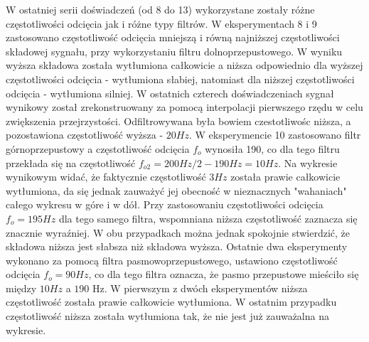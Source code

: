 \documentclass[12pt]{article}
\begin{document}
{{            W ostatniej serii doświadczeń (od 8 do 13) wykorzystane zostały różne
            częstotliwości odcięcia jak i różne typy filtrów. W eksperymentach 8 i 9
            zastosowano częstotliwość odcięcia mniejszą i równą najniższej częstotliwości
            składowej sygnału, przy wykorzystaniu filtru dolnoprzepustowego. W wyniku
            wyższa składowa została wytłumiona całkowicie a niższa odpowiednio dla wyższej
            częstotliwości odcięcia - wytłumiona słabiej, natomiast dla niższej
            częstotliwości odcięcia - wytłumiona silniej. W ostatnich czterech
            doświadczeniach sygnał wynikowy został zrekonstruowany za pomocą interpolacji
            pierwszego rzędu w celu zwiększenia przejrzystości. Odfiltrowywana była bowiem
            czestotliwośc niższa, a pozostawiona częstotliwość wyższa - $20Hz$. W
            eksperymencie 10 zastosowano filtr górnoprzepustowy a częstotliwość odcięcia
            $f_o$ wynosiła 190, co dla tego filtru przekłada się na częstotliwość $f_{o2} =
            200Hz / 2 - 190Hz = 10Hz$. Na wykresie wynikowym widać, że faktycznie
            częstotliwość $3Hz$ została prawie całkowicie wytłumiona, da się jednak
            zauważyć jej obecność w nieznacznych "wahaniach" całego wykresu w góre i w
            dół. Przy zastosowaniu częstotliwości odcięcia $f_o = 195Hz$ dla tego samego
            filtra, wspomniana niższa częstotliwość zaznacza się znacznie wyraźniej. W obu
            przypadkach można jednak spokojnie stwierdzić, że składowa niższa jest
            słabsza niż składowa wyższa. Ostatnie dwa eksperymenty wykonano za pomocą
            filtra pasmowoprzepustowego, ustawiono częstotliwość odcięcia $f_o = 90Hz$, co
            dla tego filtra oznacza, że pasmo przepustowe mieściło się między $10Hz$ a
            $190$ Hz. W pierwszym z dwóch eksperymentów niższa częstotliwość została
            prawie całkowicie wytłumiona. W ostatnim przypadku częstotliwość niższa
            została wytłumiona tak, że nie jest już zauważalna na wykresie.
        }

}
\end{document}
